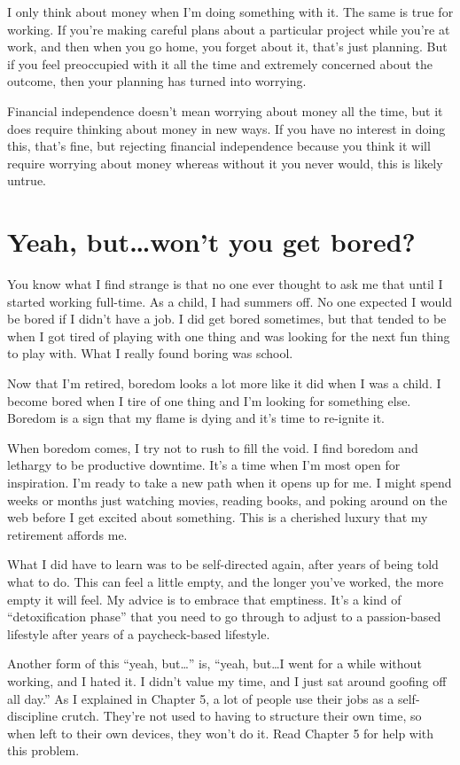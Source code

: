 I only think about money when I'm doing something with it. The same is true for working. If you're making careful plans about a particular project while you're at work, and then when you go home, you forget about it, that's just planning. But if you feel preoccupied with it all the time and extremely concerned about the outcome, then your planning has turned into worrying.

Financial independence doesn't mean worrying about money all the time, but it does require thinking about money in new ways. If you have no interest in doing this, that's fine, but rejecting financial independence because you think it will require worrying about money whereas without it you never would, this is likely untrue.

\section{Yeah, but\ldots won't you get bored?}
You know what I find strange is that no one ever thought to ask me that until I started working full-time. As a child, I had summers off. No one expected I would be bored if I didn't have a job. I did get bored sometimes, but that tended to be when I got tired of playing with one thing and was looking for the next fun thing to play with. What I really found boring was school.

Now that I'm retired, boredom looks a lot more like it did when I was a child. I become bored when I tire of one thing and I'm looking for something else. Boredom is a sign that my flame is dying and it's time to re-ignite it.

When boredom comes, I try not to rush to fill the void. I find boredom and lethargy to be productive downtime. It's a time when I'm most open for inspiration. I'm ready to take a new path when it opens up for me. I might spend weeks or months just watching movies, reading books, and poking around on the web before I get excited about something. This is a cherished luxury that my retirement affords me.

What I did have to learn was to be self-directed again, after years of being told what to do. This can feel a little empty, and the longer you've worked, the more empty it will feel. My advice is to embrace that emptiness. It's a kind of ``detoxification phase'' that you need to go through to adjust to a passion-based lifestyle after years of a paycheck-based lifestyle.

Another form of this ``yeah, but\ldots'' is, ``yeah, but\ldots I went for a while without working, and I hated it. I didn't value my time, and I just sat around goofing off all day.'' As I explained in Chapter 5, a lot of people use their jobs as a self-discipline crutch. They're not used to having to structure their own time, so when left to their own devices, they won't do it. Read Chapter 5 for help with this problem.

